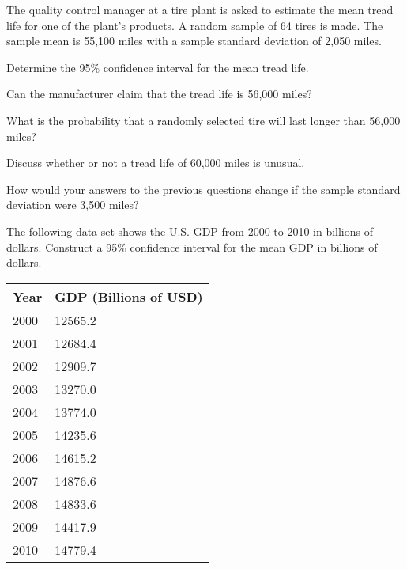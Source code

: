 \begin{problem}
    \vfill

\clearpage

\item The quality control manager at a tire plant is asked to estimate
  the mean tread life for one of the plant's products. A random sample
  of 64 tires is made. The sample mean is 55,100 miles with a sample
  standard deviation of 2,050 miles. 
  \begin{subproblem}
  \item Determine the 95\% confidence interval for the mean tread
    life.

    \vfill

  \item Can the manufacturer claim that the tread life is 56,000
    miles?

    \vfill

  \item What is the probability that a randomly selected tire will
    last longer than 56,000 miles?

    \vfill

  \item Discuss whether or not a tread life of 60,000 miles is unusual.

    \vfill

  \item How would your answers to the previous questions change if the
    sample standard deviation were 3,500 miles?

    \vfill

  \end{subproblem}

\clearpage

\item The following data set shows the U.S. GDP from 2000 to 2010 in
  billions of dollars. Construct a 95\% confidence interval for the
  mean GDP in billions of dollars.

    \begin{tabular}{l|l}
      Year & GDP (Billions of USD) \\ \hline
      2000 & 12565.2 \\
      2001 & 12684.4 \\
      2002 & 12909.7 \\
      2003 & 13270.0 \\
      2004 & 13774.0 \\
      2005 & 14235.6 \\
      2006 & 14615.2 \\
      2007 & 14876.6 \\
      2008 & 14833.6 \\
      2009 & 14417.9 \\
      2010 & 14779.4
    \end{tabular}


\end{problem}


